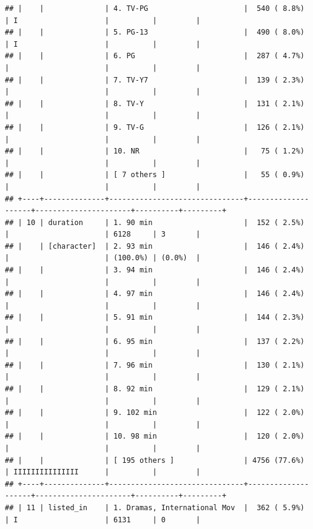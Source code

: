 \documentclass[11pt,preprint]{elsarticle}
\numberwithin{equation}{section}
\numberwithin{figure}{section}
\numberwithin{table}{section}
\begin{document}
\begin{verbatim}
## |    |              | 4. TV-PG                      |  540 ( 8.8%)       | I                    |          |         |
## |    |              | 5. PG-13                      |  490 ( 8.0%)       | I                    |          |         |
## |    |              | 6. PG                         |  287 ( 4.7%)       |                      |          |         |
## |    |              | 7. TV-Y7                      |  139 ( 2.3%)       |                      |          |         |
## |    |              | 8. TV-Y                       |  131 ( 2.1%)       |                      |          |         |
## |    |              | 9. TV-G                       |  126 ( 2.1%)       |                      |          |         |
## |    |              | 10. NR                        |   75 ( 1.2%)       |                      |          |         |
## |    |              | [ 7 others ]                  |   55 ( 0.9%)       |                      |          |         |
## +----+--------------+-------------------------------+--------------------+----------------------+----------+---------+
## | 10 | duration     | 1. 90 min                     |  152 ( 2.5%)       |                      | 6128     | 3       |
## |    | [character]  | 2. 93 min                     |  146 ( 2.4%)       |                      | (100.0%) | (0.0%)  |
## |    |              | 3. 94 min                     |  146 ( 2.4%)       |                      |          |         |
## |    |              | 4. 97 min                     |  146 ( 2.4%)       |                      |          |         |
## |    |              | 5. 91 min                     |  144 ( 2.3%)       |                      |          |         |
## |    |              | 6. 95 min                     |  137 ( 2.2%)       |                      |          |         |
## |    |              | 7. 96 min                     |  130 ( 2.1%)       |                      |          |         |
## |    |              | 8. 92 min                     |  129 ( 2.1%)       |                      |          |         |
## |    |              | 9. 102 min                    |  122 ( 2.0%)       |                      |          |         |
## |    |              | 10. 98 min                    |  120 ( 2.0%)       |                      |          |         |
## |    |              | [ 195 others ]                | 4756 (77.6%)       | IIIIIIIIIIIIIII      |          |         |
## +----+--------------+-------------------------------+--------------------+----------------------+----------+---------+
## | 11 | listed_in    | 1. Dramas, International Mov  |  362 ( 5.9%)       | I                    | 6131     | 0       |

\end{verbatim}
\end{document}

